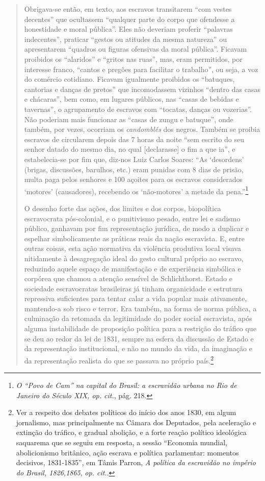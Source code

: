 \begin{quote}
Obrigava-se então, em texto, aos escravos transitarem ``com vestes
decentes'' que ocultassem ``qualquer parte do corpo que ofendesse a
honestidade e moral pública''. Eles não deveriam proferir ``palavras
indecentes'', praticar ``gestos ou atitudes da mesma natureza'' ou
apresentarem ``quadros ou figuras ofensivas da moral pública''. Ficavam
proibidos os ``alaridos'' e ``gritos nas ruas'', mas, eram permitidos,
por interesse franco, ``cantos e pregões para facilitar o trabalho'', ou
seja, a voz do comércio cotidiano. Ficavam igualmente proibidos os
``batuques, cantorias e danças de pretos'' que incomodassem vizinhos
``dentro das casas e chácaras'', bem como, em lugares públicos, nas
``casas de bebidas e tavernas'', o agrupamento de escravos com
``tocatas, danças ou vozerias''. Não poderiam mais funcionar as ``casas
de zungu e batuque'', onde também, por vezes, ocorriam os
\emph{candomblés} dos negros. Também se proibia escravos de circularem
depois das 7 horas da noite ``sem escrito do seu senhor datado do mesmo
dia, no qual {[}declarasse{]} o fim a que ia'', e estabelecia-se por fim
que, diz-nos Luiz Carlos Soares: ``As `desordens' (brigas, discussões,
barulhos, etc.) eram punidas com 8 dias de prisão, multa paga pelos
senhores e 100 açoites para os escravos considerados `motores'
(causadores), recebendo os `não-motores' a metade da pena.''\footnote{\emph{O
  ``Povo de Cam'' na capital do Brasil: a escravidão urbana no Rio de
  Janeiro do Século XIX, op. cit.}, pág. 218.}

O desenho forte das ações, dos limites e dos corpos, biopolítica
escravocrata pós-colonial, e o punitivismo pesado, entre lei e sadismo
público, ganhavam por fim representação jurídica, de modo a duplicar e
espelhar simbolicamente as práticas reais da nação escravista. E, entre
outras coisas, esta ação normativa da violência produtiva local visava
nitidamente à desagregação ideal do gesto cultural próprio ao escravo,
reduzindo aquele espaço de manifestação e de experiência simbólica e
corpórea que chamou a atenção sensível de Schlichthorst. Estado e
sociedade escravocratas brasileiras já tinham organicidade e estrutura
repressiva suficientes para tentar calar a vida popular mais ativamente,
mantendo-a sob risco e terror. Era também, na forma de norma pública, a
culminação da retomada da legitimidade do poder social escravista, após
alguma instabilidade de proposição política para a restrição do tráfico
que se deu ao redor da lei de 1831, sempre na esfera da discussão de
Estado e da representação institucional, e não no mundo da vida, da
imaginação e da representação realista do que se passava no próprio
país.\footnote{Ver a respeito dos debates políticos do início dos anos
  1830, em algum jornalismo, mas principalmente na Câmara dos Deputados,
  pela aceleração e extinção do tráfico, e gradual abolição, e a forte
  reação político ideológica saquarema que se seguiu em resposta, a
  sessão ``Economia mundial, abolicionismo britânico, ação escrava e
  política parlamentar: momentos decisivos, 1831-1835'', em Tâmis
  Parron, \emph{A política da escravidão no império do Brasil,
  1826,1865}, \emph{op. cit.}.}


\end{quote}
